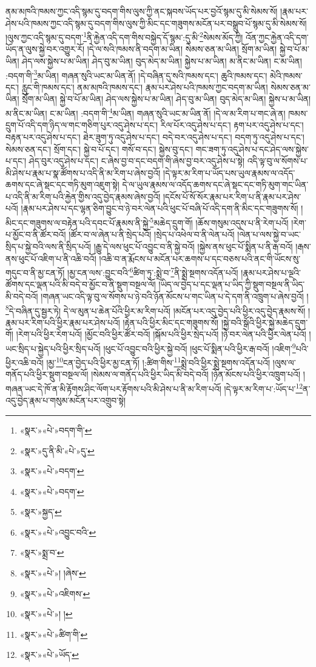 ནམ་མཁའི་ཁམས་ཀྱང་འདི་སྙམ་དུ་བདག་གིས་ལུས་ཀྱི་ནང་སྐབས་ཡོད་པར་བྱའོ་སྙམ་དུ་མི་སེམས་སོ། །རྣམ་པར་ཤེས་པའི་ཁམས་ཀྱང་འདི་སྙམ་དུ་བདག་གིས་ལུས་ཀྱི་མིང་དང་གཟུགས་མངོན་པར་བསྒྲུབ་པོ་སྙམ་དུ་མི་སེམས་སོ། །ལུས་ཀྱང་འདི་སྙམ་དུ་བདག་\footnote{«སྣར་»«པེ་»བདག་གི་}ནི་རྐྱེན་འདི་དག་གིས་བསྐྱེད་དོ་སྙམ་:དུ་མི་\footnote{«སྣར་»དུ་ནི་མི་«པེ་»དུ་}སེམས་མོད་ཀྱི། འོན་ཀྱང་རྐྱེན་འདི་དག་ཡོད་ན་ལུས་སྐྱེ་བར་འགྱུར་རོ། །དེ་ལ་སའི་ཁམས་ནི་བདག་མ་ཡིན། སེམས་ཅན་མ་ཡིན། སྲོག་མ་ཡིན། སྐྱེ་བ་པོ་མ་ཡིན། ཤེད་ལས་སྐྱེས་པ་མ་ཡིན། ཤེད་བུ་མ་ཡིན། བུད་མེད་མ་ཡིན། སྐྱེས་པ་མ་ཡིན། མ་ནིང་མ་ཡིན། ང་མ་ཡིན། :བདག་གི་\footnote{«སྣར་»«པེ་»བདག་}མ་ཡིན། གཞན་སུའི་ཡང་མ་ཡིན་ནོ། །དེ་བཞིན་དུ་སའི་ཁམས་དང་། ཆུའི་ཁམས་དང་། མེའི་ཁམས་དང་། རླུང་གི་ཁམས་དང་། ནམ་མཁའི་ཁམས་དང་། རྣམ་པར་ཤེས་པའི་ཁམས་ཀྱང་བདག་མ་ཡིན། སེམས་ཅན་མ་ཡིན། སྲོག་མ་ཡིན། སྐྱེ་བ་པོ་མ་ཡིན། ཤེད་ལས་སྐྱེས་པ་མ་ཡིན། ཤེད་བུ་མ་ཡིན། བུད་མེད་མ་ཡིན། སྐྱེས་པ་མ་ཡིན། མ་ནིང་མ་ཡིན། ང་མ་ཡིན། :བདག་གི་\footnote{«སྣར་»«པེ་»བདག་}མ་ཡིན། གཞན་སུའི་ཡང་མ་ཡིན་ནོ། །དེ་ལ་མ་རིག་པ་གང་ཞེ་ན། ཁམས་དྲུག་པོ་འདི་དག་ཉིད་ལ་གང་གཅིག་པུར་འདུ་ཤེས་པ་དང་། རིལ་པོར་འདུ་ཤེས་པ་དང་། རྟག་པར་འདུ་ཤེས་པ་དང་། བརྟན་པར་འདུ་ཤེས་པ་དང་། ཐེར་ཟུག་ཏུ་འདུ་ཤེས་པ་དང་། བདེ་བར་འདུ་ཤེས་པ་དང་། བདག་ཏུ་འདུ་ཤེས་པ་དང་། སེམས་ཅན་དང་། སྲོག་དང་། སྐྱེ་བ་པོ་དང་། གསོ་བ་དང་། སྐྱེས་བུ་དང་། གང་ཟག་ཏུ་འདུ་ཤེས་པ་དང་ཤེད་ལས་སྐྱེས་པ་དང་། ཤེད་བུར་འདུ་ཤེས་པ་དང་། ང་ཞེས་བྱ་བ་དང་བདག་གི་ཞེས་བྱ་བར་འདུ་ཤེས་པ་སྟེ། འདི་ལྟ་བུ་ལ་སོགས་པ་མི་ཤེས་པ་རྣམ་པ་སྣ་ཚོགས་པ་འདི་ནི་མ་རིག་པ་ཞེས་བྱའོ། །དེ་ལྟར་མ་རིག་པ་ཡོད་པས་ཡུལ་རྣམས་ལ་འདོད་ཆགས་དང་ཞེ་སྡང་དང་གཏི་མུག་འཇུག་སྟེ། དེ་ལ་ཡུལ་རྣམས་ལ་འདོད་ཆགས་དང་ཞེ་སྡང་དང་གཏི་མུག་གང་ཡིན་པ་འདི་ནི་མ་རིག་པའི་རྐྱེན་གྱིས་འདུ་བྱེད་རྣམས་ཞེས་བྱའོ། །དངོས་པོ་སོ་སོར་རྣམ་པར་རིག་པ་ནི་རྣམ་པར་ཤེས་པའོ། །རྣམ་པར་ཤེས་པ་དང་ལྷན་ཅིག་བྱུང་བ་ཉེ་བར་ལེན་པའི་ཕུང་པོ་བཞི་པོ་འདི་དག་ནི་མིང་དང་གཟུགས་སོ། །མིང་དང་གཟུགས་ལ་བརྟེན་པའི་དབང་པོ་རྣམས་ནི་སྐྱེ་\footnote{«སྣར་»སྐྱད་}མཆེད་དྲུག་གོ། །ཆོས་གསུམ་འདུས་པ་ནི་རེག་པའོ། །རེག་པ་མྱོང་བ་ནི་ཚོར་བའོ། །ཚོར་བ་ལ་ཞེན་པ་ནི་སྲེད་པའོ། །སྲེད་པ་འཕེལ་བ་ནི་ལེན་པའོ། །ལེན་པ་ལས་སྐྱེ་བ་ཡང་སྲིད་པ་སྐྱེ་བའི་ལས་ནི་སྲིད་པའོ། །རྒྱུ་དེ་ལས་ཕུང་པོ་འབྱུང་བ་ནི་སྐྱེ་བའོ། །སྐྱེས་ནས་ཕུང་པོ་སྨིན་པ་ནི་རྒ་བའོ། །རྒས་ནས་ཕུང་པོ་འཇིག་པ་ནི་འཆི་བའོ། །འཆི་བ་ན་རྨོངས་པ་མངོན་པར་ཆགས་པ་དང་བཅས་པའི་ནང་གི་ཡོངས་སུ་གདུང་བ་ནི་མྱ་ངན་ཏོ། །མྱ་ངན་ལས་:བྱུང་བའི་\footnote{«སྣར་»«པེ་»འབྱུང་བའི་}ཚིག་ཏུ་:སྨྲེ་བ་\footnote{«སྣར་»སྨྲ་བ་}ནི་སྨྲེ་སྔགས་འདོན་པའོ། །རྣམ་པར་ཤེས་པ་ལྔའི་ཚོགས་དང་ལྡན་པའི་མི་བདེ་བ་མྱོང་བ་ནི་སྡུག་བསྔལ་ལོ། །ཡིད་ལ་བྱེད་པ་དང་ལྡན་པ་ཡིད་ཀྱི་སྡུག་བསྔལ་ནི་ཡིད་མི་བདེ་བའོ། །གཞན་ཡང་འདི་ལྟ་བུ་ལ་སོགས་པ་ཉེ་བའི་ཉོན་མོངས་པ་གང་ཡིན་པ་དེ་དག་ནི་འཁྲུག་པ་ཞེས་བྱའོ། །\footnote{«སྣར་»«པེ་»། །ཞེས་}དེ་བཞིན་དུ་སྦྱར་ཏེ། དེ་ལ་མུན་པ་ཆེན་པོའི་ཕྱིར་མ་རིག་པའོ། །མངོན་པར་འདུ་བྱེད་པའི་ཕྱིར་འདུ་བྱེད་རྣམས་སོ། །རྣམ་པར་རིག་པའི་ཕྱིར་རྣམ་པར་ཤེས་པའོ། །རྟེན་པའི་ཕྱིར་མིང་དང་གཟུགས་སོ། །སྐྱེ་བའི་སྒོའི་ཕྱིར་སྐྱེ་མཆེད་དྲུག་གོ། །རེག་པའི་ཕྱིར་རེག་པའོ། །མྱོང་བའི་ཕྱིར་ཚོར་བའོ། །སྐོམ་པའི་ཕྱིར་སྲེད་པའོ། །ཉེ་བར་ལེན་པའི་ཕྱིར་ལེན་པའོ། །ཡང་སྲིད་པ་སྐྱེད་པའི་ཕྱིར་སྲིད་པའོ། །ཕུང་པོ་འབྱུང་བའི་ཕྱིར་སྐྱེ་བའོ། །ཕུང་པོ་སྨིན་པའི་ཕྱིར་རྒ་བའོ། །འཇིག་\footnote{«སྣར་»«པེ་»འཇིགས་}པའི་ཕྱིར་འཆི་བའོ། །མྱ་\footnote{«སྣར་»«པེ་»། །}ངན་བྱེད་པའི་ཕྱིར་མྱ་ངན་ཏོ། །:ཚིག་གིས་\footnote{«སྣར་»«པེ་»ཚིག་གི་}སྨྲེ་བའི་ཕྱིར་སྨྲེ་སྔགས་འདོན་པའོ། །ལུས་ལ་གནོད་པའི་ཕྱིར་སྡུག་བསྔལ་ལོ། །སེམས་ལ་གནོད་པའི་ཕྱིར་ཡིད་མི་བདེ་བའོ། །ཉོན་མོངས་པའི་ཕྱིར་འཁྲུག་པའོ། །གཞན་ཡང་དེ་ཁོ་ན་མི་རྟོགས་ཤིང་ལོག་པར་རྟོགས་པའི་མི་ཤེས་པ་ནི་མ་རིག་པའོ། །དེ་ལྟར་མ་རིག་པ་:ཡོད་པ་\footnote{«སྣར་»«པེ་»ཡོད་}ན་འདུ་བྱེད་རྣམ་པ་གསུམ་མངོན་པར་འགྲུབ་སྟེ། 